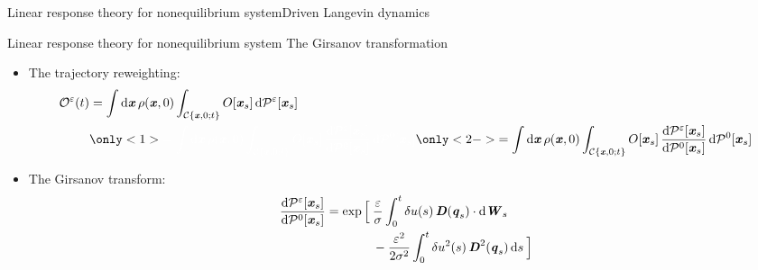 \documentclass[fleqn]{beamer}
\newcommand{\redc}[1]{{\color{red} #1}}
\newcommand{\bluec}[1]{{\color{blue} #1}}
\newcommand{\whitec}[1]{{\color{white} #1}}
\newcommand{\vect}[1]{\textbf{\textit{#1}}}
\newcommand{\dd}[0]{\textrm{d}}
\newcommand{\fe}{u}
\newcommand{\eps}{\varepsilon}
\newcommand{\mo}{\mathcal O}
\newcommand{\mc}{\mathcal C}
\newcommand{\pathmeas}{\mathcal P}
\begin{document}
\begin{frame}{Linear response theory for nonequilibrium system}{Driven Langevin dynamics}
\end{frame}



\begin{frame}{Linear response theory for nonequilibrium system}
  {The Girsanov transformation}
  \begin{itemize}
  \item <1-> The trajectory reweighting:
    \bluec{
      \begin{align*}
        \mo^\eps(t)
        &= \int \dd \vect x\, \rho(\vect x, 0)
        \int_{\mc\{\vect x,0; t\}} O[\vect x_s]\,\dd \pathmeas^\eps[\vect x_s]\\
        &
        \only<1>{
          \whitec{
        = \int \dd \vect x\, \rho(\vect x, 0)
        \int_{\mc\{\vect x,0; t\}} O[\vect x_s]\,
        \frac{\dd\pathmeas^\eps[\vect x_s]}{\dd\pathmeas^0[\vect x_s]}\,
        \dd\pathmeas^0[\vect x_s]}
        }
        \only<2->{
        = \int \dd \vect x\, \rho(\vect x, 0)
        \int_{\mc\{\vect x,0; t\}} O[\vect x_s]\,
        \frac{\dd\pathmeas^\eps[\vect x_s]}{\dd\pathmeas^0[\vect x_s]}\,
        \dd\pathmeas^0[\vect x_s]
        }
      \end{align*}
    }
  \item<3-> The \redc{Girsanov transform}:
    \bluec{
      \begin{align*}
        \frac{\dd\pathmeas^\eps[\vect x_s]}{\dd\pathmeas^0[\vect x_s]}
        =
        \exp
        \Big[\:&
        \frac{\eps}\sigma\int_0^t
        \delta\fe(s)\,\vect D(\vect q_s)\cdot\dd\vect W_s\\
        &-
        \frac {\eps^2}{2\sigma^2}\int_0^t
        \delta\fe^2(s)\,\vect D^2(\vect q_s)\,\dd s\:
        \Big]
      \end{align*}
    }
  \end{itemize}
\end{frame}
\end{document}

